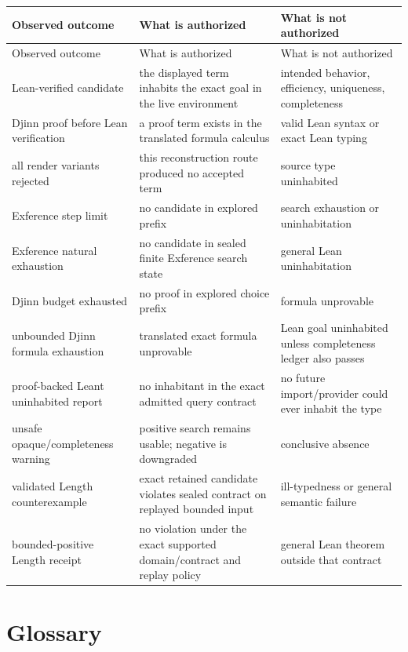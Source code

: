 \documentclass[10pt,letterpaper,oneside,openany]{report}
\begin{document}
\begin{longtable}{@{}>{\raggedright\arraybackslash}p{} >{\raggedright\arraybackslash}p{} >{\raggedright\arraybackslash}p{}@{}}
\toprule
Observed outcome & What is authorized & What is not authorized \\
\midrule
\endfirsthead
\toprule
Observed outcome & What is authorized & What is not authorized \\
\midrule
\endhead
Lean-verified candidate & the displayed term inhabits the exact goal in the live environment & intended behavior, efficiency, uniqueness, completeness \\
Djinn proof before Lean verification & a proof term exists in the translated formula calculus & valid Lean syntax or exact Lean typing \\
all render variants rejected & this reconstruction route produced no accepted term & source type uninhabited \\
Exference step limit & no candidate in explored prefix & search exhaustion or uninhabitation \\
Exference natural exhaustion & no candidate in sealed finite Exference search state & general Lean uninhabitation \\
Djinn budget exhausted & no proof in explored choice prefix & formula unprovable \\
unbounded Djinn formula exhaustion & translated exact formula unprovable & Lean goal uninhabited unless completeness ledger also passes \\
proof-backed Leant uninhabited report & no inhabitant in the exact admitted query contract & no future import/provider could ever inhabit the type \\
unsafe opaque/completeness warning & positive search remains usable; negative is downgraded & conclusive absence \\
validated Length counterexample & exact retained candidate violates sealed contract on replayed bounded input & ill-typedness or general semantic failure \\
bounded-positive Length receipt & no violation under the exact supported domain/contract and replay policy & general Lean theorem outside that contract \\
\bottomrule
\end{longtable}

\chapter{Glossary}\label{app:glossary}
\end{document}
